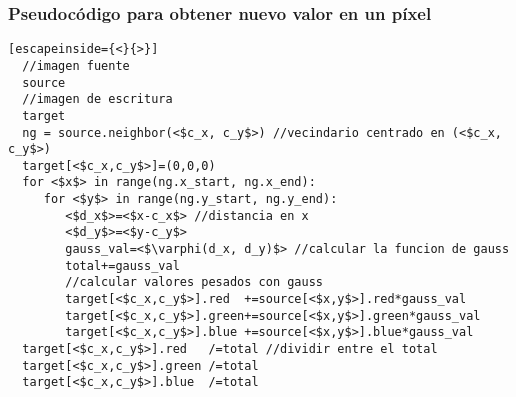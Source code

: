 \documentclass {article}
\begin{document}
\subsubsection{Pseudocódigo para obtener nuevo valor en un píxel}
\label{sec:pseudocodePixel}
\begin{lstlisting}[escapeinside={<}{>}]
  //imagen fuente
  source
  //imagen de escritura
  target
  ng = source.neighbor(<$c_x, c_y$>) //vecindario centrado en (<$c_x, c_y$>)
  target[<$c_x,c_y$>]=(0,0,0)
  for <$x$> in range(ng.x_start, ng.x_end):
     for <$y$> in range(ng.y_start, ng.y_end):
        <$d_x$>=<$x-c_x$> //distancia en x
        <$d_y$>=<$y-c_y$>
        gauss_val=<$\varphi(d_x, d_y)$> //calcular la funcion de gauss
        total+=gauss_val
        //calcular valores pesados con gauss
        target[<$c_x,c_y$>].red  +=source[<$x,y$>].red*gauss_val 
        target[<$c_x,c_y$>].green+=source[<$x,y$>].green*gauss_val
        target[<$c_x,c_y$>].blue +=source[<$x,y$>].blue*gauss_val
  target[<$c_x,c_y$>].red   /=total //dividir entre el total
  target[<$c_x,c_y$>].green /=total
  target[<$c_x,c_y$>].blue  /=total
        
\end{lstlisting}
\end{document}
